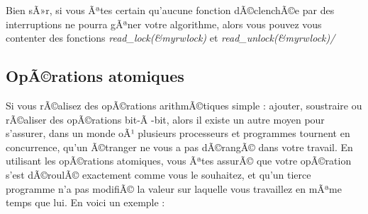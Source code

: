 \documentclass[11pt]{article}
\begin{document}
Bien sÃ»r, si vous Ãªtes certain qu'aucune fonction dÃ©clenchÃ©e par des interruptions ne pourra gÃªner votre algorithme, alors vous pouvez vous contenter des fonctions \emph{read\_lock(\&myrwlock)} et \emph{read\_unlock(\&myrwlock)/}

\subsection*{OpÃ©rations atomiques}
\label{sec-12-4}

Si vous rÃ©alisez des opÃ©rations arithmÃ©tiques simple : ajouter, soustraire ou rÃ©aliser des opÃ©rations bit-Ã -bit, alors il existe un autre moyen pour s'assurer, dans un monde oÃ¹ plusieurs processeurs et programmes tournent en concurrence, qu'un Ã©tranger ne vous a pas dÃ©rangÃ© dans votre travail. En utilisant les opÃ©rations atomiques, vous Ãªtes assurÃ© que votre opÃ©ration s'est dÃ©roulÃ© exactement comme vous le souhaitez, et qu'un tierce programme n'a pas modifiÃ© la valeur sur laquelle vous travaillez en mÃªme temps que lui. En voici un exemple :
\end{document}
